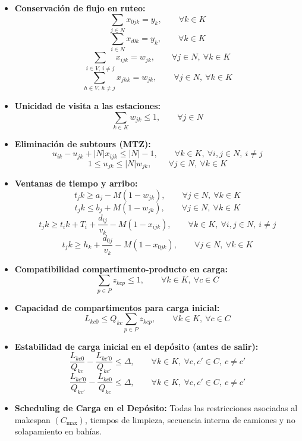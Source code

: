 \begin{itemize}
    \item \textbf{Conservación de flujo en ruteo:}
    \[
    \sum_{j \in N} x_{0jk} = y_k,
    \qquad \forall k \in K
    \]
    \[
    \sum_{i \in N} x_{i0k} = y_k,
    \qquad \forall k \in K
    \]
    \[
    \sum_{i \in V,\, i \neq j} x_{ijk} = w_{jk},
    \qquad \forall j \in N,\ \forall k \in K
    \]
    \[
    \sum_{h \in V,\, h \neq j} x_{jhk} = w_{jk},
    \qquad \forall j \in N,\ \forall k \in K
    \]

    \item \textbf{Unicidad de visita a las estaciones:}
    \[
    \sum_{k \in K} w_{jk} \leq 1,
    \qquad \forall j \in N
    \]

    \item \textbf{Eliminación de subtours (MTZ):}
    \[
    u_{ik} - u_{jk} + |N|x_{ijk} \leq |N| - 1,
    \qquad \forall k \in K,\ \forall i,j \in N,\ i \neq j
    \]
    \[
    1 \leq u_{jk} \leq |N|w_{jk},
    \qquad \forall j \in N,\ \forall k \in K
    \]

    \item \textbf{Ventanas de tiempo y arribo:}
    \[
    t_jk \geq a_j - M(1-w_{jk}),
    \qquad \forall j \in N,\ \forall k \in K
    \]
    \[
    t_jk \leq b_j + M(1-w_{jk}),
    \qquad \forall j \in N,\ \forall k \in K
    \]
    \[
    t_jk \geq t_ik + T_i + \frac{d_{ij}}{v_k} - M(1-x_{ijk}),
    \qquad \forall k \in K,\ \forall i,j \in N,\ i \neq j
    \]
    \[
    t_jk \geq h_k + \frac{d_{0j}}{v_k} - M(1-x_{0jk}),
    \qquad \forall j \in N,\ \forall k \in K
    \]

    \item \textbf{Compatibilidad compartimento-producto en carga:}
    \[
    \sum_{p \in P} z_{kcp} \leq 1,
    \qquad \forall k \in K,\ \forall c \in C
    \]

    \item \textbf{Capacidad de compartimentos para carga inicial:}
    \[
    L_{kc0} \leq Q_{kc}\sum_{p \in P} z_{kcp},
    \qquad \forall k \in K,\ \forall c \in C
    \]

    \item \textbf{Estabilidad de carga inicial en el depósito (antes de salir):}
    \[
    \frac{L_{kc0}}{Q_{kc}} - \frac{L_{kc'0}}{Q_{kc'}} \leq \Delta,
    \qquad \forall k \in K,\ \forall c,c' \in C,\ c \neq c'
    \]
    \[
    \frac{L_{kc'0}}{Q_{kc'}} - \frac{L_{kc0}}{Q_{kc}} \leq \Delta,
    \qquad \forall k \in K,\ \forall c,c' \in C,\ c \neq c'
    \]

    \item \textbf{Scheduling de Carga en el Depósito:} Todas las restricciones asociadas al makespan $(C_{\max})$, tiempos de limpieza, secuencia interna de camiones y no solapamiento en bahías.
\end{itemize}

